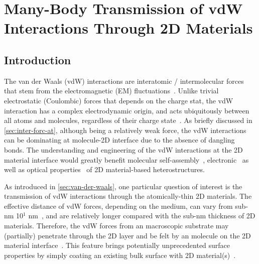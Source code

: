 \chapter{Many-Body Transmission of vdW Interactions Through 2D Materials}
\label{ch:vdw}
\renewcommand*\imgdir{img/vdw/}

%

\vspace{1em}


\section{Introduction}
\label{sec:vdw-introduction}
The van der Waals (vdW) interactions are inter\-atomic /
inter\-molecular forces that stem from the electromagnetic (EM)
fluctuations~\cite{Israelachvili_2011_book,Woods_2016_rev_vdw,parsegian_van_2010_book}.
%
Unlike trivial electrostatic (Coulombic) forces that depends on the
charge stat, the vdW interaction has a complex electro\-dynamic
origin, and acts ubiquitously between all atoms and molecules,
regardless of their charge
state~\cite{Israelachvili_2011_book,Hermann_2017_vdW_rev}.
%
As briefly discussed in \autoref{sec:inter-forc-at}, although being a
relatively weak force, the vdW interactions can be dominating at
molecule-2D interface due to the absence of dangling bonds.
%
The understanding and engineering of the vdW interactions at the 2D
material interface would greatly benefit molecular
self-assembly~\cite{Kumar_2017_rev_assemb_2D},
electronic~\cite{Wang_2015_phys_chem_tuning_TMDC,Lazar_2013} as well
as optical properties~\cite{Geim_2013_2D_vdw_Het,Novoselov_2016_vdW}
of 2D material-based hetero\-structures.
%

As introduced in \autoref{sec:van-der-waals}, one particular question
of interest is the transmission of vdW interactions through the
atomically-thin 2D materials.
%
The effective distance of vdW forces, depending on the medium, can
vary from sub-nm 10$^{1}$ nm~\cite{Israelachvili_2011_book}, and are
relatively longer compared with the sub-nm thickness of 2D materials.
%
Therefore, the vdW forces from an macroscopic substrate may
(partially) penetrate through the 2D layer and be felt by an molecule
on the 2D material interface~\cite{shih_2013_wetting_natmat}.
%
This feature
brings potentially unprecedented surface properties by simply coating
an existing bulk surface with 2D
material(s)~\cite{Prasai_2012_coating,rafiee_2012_transparency,Tsoi_2014_vdW_screening_2D}.
%

